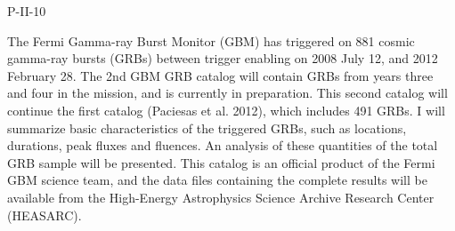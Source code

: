 P-II-10


\bigskip



\bigskip

\noindent The Fermi Gamma-ray Burst Monitor (GBM) has triggered on 881 cosmic gamma-ray bursts (GRBs) between trigger enabling on  2008 July 12, and 2012 February 28. The 2nd GBM GRB catalog will contain GRBs from years three and four in the mission, and is currently in preparation. This second catalog will continue the first catalog (Paciesas et al. 2012), which includes 491 GRBs. I will summarize basic characteristics of the triggered GRBs, such as locations, durations, peak fluxes and fluences. An analysis of these quantities of the total GRB sample will be presented. This catalog is an official product of the Fermi GBM science team, and the data files containing the complete results will be available from the High-Energy Astrophysics Science Archive Research Center (HEASARC).

